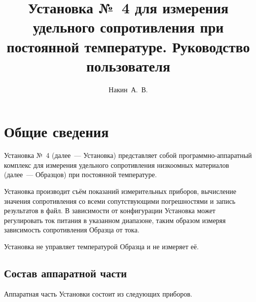 \documentclass[12pt, a4paper, twocolumn]{book}
\title{Установка №~4 для измерения удельного сопротивления при постоянной температуре. Руководство пользователя}
\author{Накин~А.~В.}
\begin{document}
\maketitle

\tableofcontents

\chapter{Общие сведения}

Установка №~4 (далее~--- Установка) представляет собой программно-аппаратный комплекс для измерения удельного сопротивления низкоомных материалов (далее~--- Образцов) при постоянной температуре.

Установка производит съём показаний измерительных приборов, вычисление значения сопротивления со всеми сопутствующими погрешностями и запись результатов в файл. В зависимости от конфигурации Установка может регулировать ток питания в указанном диапазоне, таким образом измеряя зависимость сопротивления Образца от тока.

Установка не управляет температурой Образца и не измеряет её.

\section{Состав аппаратной части}

Аппаратная часть Установки состоит из следующих приборов.
\end{document}
